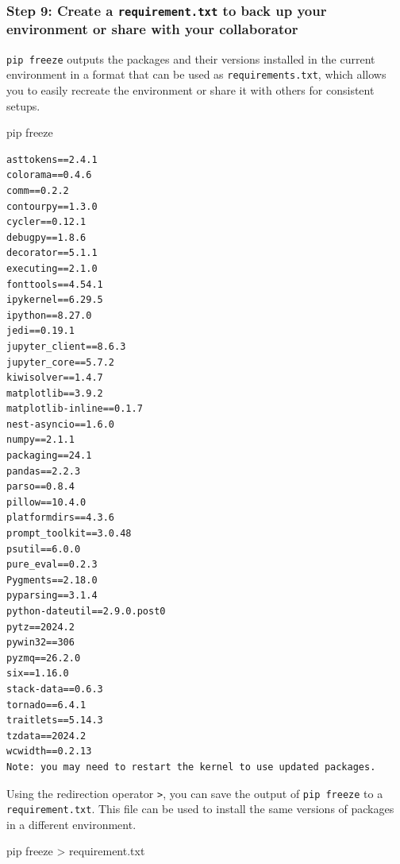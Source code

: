 \documentclass[
  letterpaper,
  DIV=11,
  numbers=noendperiod]{scrreprt}
\newenvironment{Shaded}{\begin{snugshade}}{\end{snugshade}}
\newcommand{\NormalTok}[1]{\textcolor[rgb]{0.00,0.23,0.31}{#1}}
\newcommand{\OperatorTok}[1]{\textcolor[rgb]{0.37,0.37,0.37}{#1}}
\begin{document}
\hypertarget{step-9-create-a-requirement.txt-to-back-up-your-environment-or-share-with-your-collaborator}{%
\subsubsection{\texorpdfstring{Step 9: Create a \texttt{requirement.txt}
to back up your environment or share with your
collaborator}{Step 9: Create a requirement.txt to back up your environment or share with your collaborator}}\label{step-9-create-a-requirement.txt-to-back-up-your-environment-or-share-with-your-collaborator}}

\texttt{pip\ freeze} outputs the packages and their versions installed
in the current environment in a format that can be used as
\texttt{requirements.txt}, which allows you to easily recreate the
environment or share it with others for consistent setups.

\begin{Shaded}
\begin{Highlighting}[]
\NormalTok{pip freeze}
\end{Highlighting}
\end{Shaded}

\begin{verbatim}
asttokens==2.4.1
colorama==0.4.6
comm==0.2.2
contourpy==1.3.0
cycler==0.12.1
debugpy==1.8.6
decorator==5.1.1
executing==2.1.0
fonttools==4.54.1
ipykernel==6.29.5
ipython==8.27.0
jedi==0.19.1
jupyter_client==8.6.3
jupyter_core==5.7.2
kiwisolver==1.4.7
matplotlib==3.9.2
matplotlib-inline==0.1.7
nest-asyncio==1.6.0
numpy==2.1.1
packaging==24.1
pandas==2.2.3
parso==0.8.4
pillow==10.4.0
platformdirs==4.3.6
prompt_toolkit==3.0.48
psutil==6.0.0
pure_eval==0.2.3
Pygments==2.18.0
pyparsing==3.1.4
python-dateutil==2.9.0.post0
pytz==2024.2
pywin32==306
pyzmq==26.2.0
six==1.16.0
stack-data==0.6.3
tornado==6.4.1
traitlets==5.14.3
tzdata==2024.2
wcwidth==0.2.13
Note: you may need to restart the kernel to use updated packages.
\end{verbatim}

Using the redirection operator \texttt{\textgreater{}}, you can save the
output of \texttt{pip\ freeze} to a \texttt{requirement.txt}. This file
can be used to install the same versions of packages in a different
environment.

\begin{Shaded}
\begin{Highlighting}[]
\NormalTok{pip freeze }\OperatorTok{\textgreater{}}\NormalTok{ requirement.txt}
\end{Highlighting}
\end{Shaded}
\end{document}
